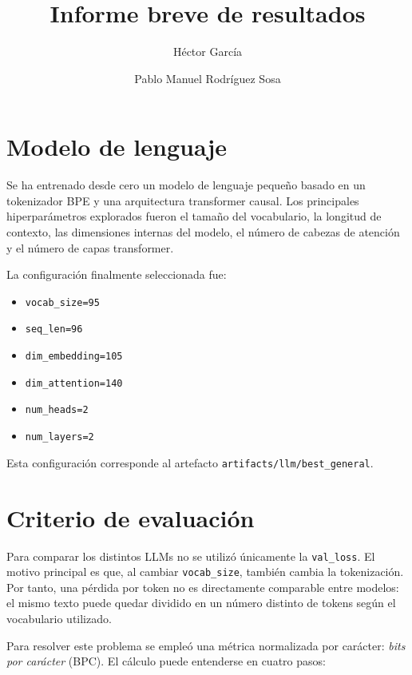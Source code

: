 ﻿\documentclass[11pt,a4paper]{article}
\title{Informe breve de resultados}
\author{Héctor García \and Pablo Manuel Rodríguez Sosa}
\date{}
\begin{document}
\maketitle

\section{Modelo de lenguaje}

Se ha entrenado desde cero un modelo de lenguaje pequeño basado en un tokenizador BPE y una arquitectura transformer causal. Los principales hiperparámetros explorados fueron el tamaño del vocabulario, la longitud de contexto, las dimensiones internas del modelo, el número de cabezas de atención y el número de capas transformer.

La configuración finalmente seleccionada fue:

\begin{itemize}
    \item \texttt{vocab\_size=95}
    \item \texttt{seq\_len=96}
    \item \texttt{dim\_embedding=105}
    \item \texttt{dim\_attention=140}
    \item \texttt{num\_heads=2}
    \item \texttt{num\_layers=2}
\end{itemize}

Esta configuración corresponde al artefacto \texttt{artifacts/llm/best\_general}.

\section{Criterio de evaluación}

Para comparar los distintos LLMs no se utilizó únicamente la \texttt{val\_loss}. El motivo principal es que, al cambiar \texttt{vocab\_size}, también cambia la tokenización. Por tanto, una pérdida por token no es directamente comparable entre modelos: el mismo texto puede quedar dividido en un número distinto de tokens según el vocabulario utilizado.

Para resolver este problema se empleó una métrica normalizada por carácter: \textit{bits por carácter} (BPC). El cálculo puede entenderse en cuatro pasos:
\end{document}
